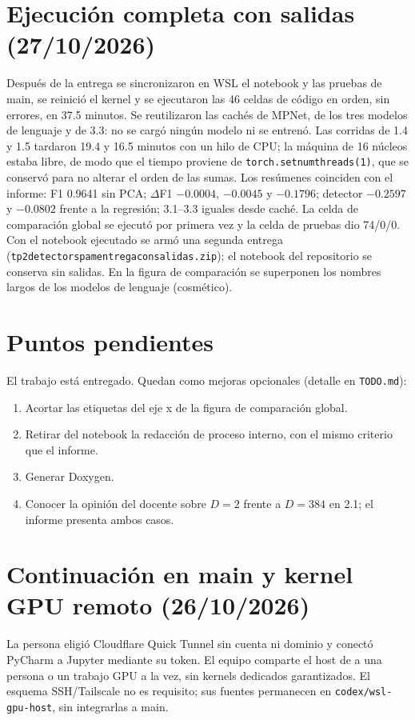 \documentclass[11pt,letterpaper]{article}
\renewcommand{\_}{\originalunderscore\allowbreak}
\begin{document}
\section{Ejecución completa con salidas (27/10/2026)}
Después de la entrega se sincronizaron en WSL el notebook y las pruebas de
main, se reinició el kernel y se ejecutaron las 46 celdas de código en orden,
sin errores, en 37.5 minutos. Se reutilizaron las cachés de MPNet, de los
tres modelos de lenguaje y de 3.3: no se cargó ningún modelo ni se entrenó.
Las corridas de 1.4 y 1.5 tardaron 19.4 y 16.5 minutos con un hilo de CPU;
la máquina de 16 núcleos estaba libre, de modo que el tiempo proviene de
\texttt{torch.set\_num\_threads(1)}, que se conservó para no alterar el
orden de las sumas. Los resúmenes coinciden con el informe: F1 0.9641 sin
PCA; $\Delta$F1 $-0.0004$, $-0.0045$ y $-0.1796$; detector $-0.2597$ y
$-0.0802$ frente a la regresión; 3.1--3.3 iguales desde caché. La celda de
comparación global se ejecutó por primera vez y la celda de pruebas dio
74/0/0. Con el notebook ejecutado se armó una segunda entrega
(\texttt{tp2\_detector\_spam\_entrega\_con\_salidas.zip}); el notebook del
repositorio se conserva sin salidas. En la figura de comparación se
superponen los nombres largos de los modelos de lenguaje (cosmético).

\section{Puntos pendientes}
El trabajo está entregado. Quedan como mejoras opcionales (detalle en
\texttt{TODO.md}):
\begin{enumerate}
\item Acortar las etiquetas del eje x de la figura de comparación global.
\item Retirar del notebook la redacción de proceso interno, con el mismo
criterio que el informe.
\item Generar Doxygen.
\item Conocer la opinión del docente sobre $D=2$ frente a $D=384$ en 2.1;
el informe presenta ambos casos.
\end{enumerate}

\section{Continuación en main y kernel GPU remoto (26/10/2026)}
La persona eligió Cloudflare Quick Tunnel sin cuenta ni dominio y conectó
PyCharm a Jupyter mediante su token. El equipo comparte el host de a una
persona o un trabajo GPU a la vez, sin kernels dedicados garantizados.
El esquema SSH/Tailscale no es requisito; sus fuentes permanecen en
\texttt{codex/wsl-gpu-host}, sin integrarlas a main.
\end{document}
